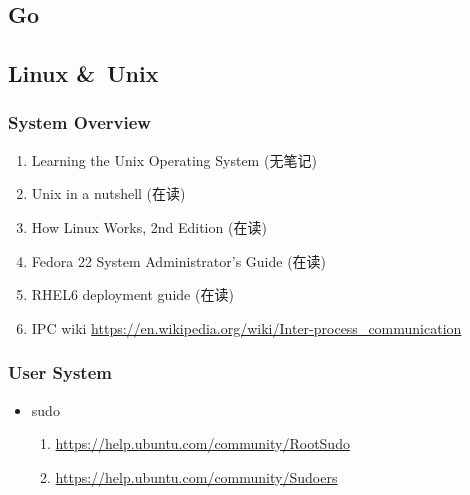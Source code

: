 \documentclass{article}
\begin{document}
\subsection{Go}
%
\subsection{Linux \&\ Unix}
\subsubsection{System Overview}
\begin{enumerate}
    \item Learning the Unix Operating System (无笔记)
    \item Unix in a nutshell (在读)
    \item How Linux Works, 2nd Edition (在读)
    \item Fedora 22 System Administrator's Guide (在读)
    \item RHEL6 deployment guide (在读)
    \item IPC wiki \url{https://en.wikipedia.org/wiki/Inter-process_communication}
\end{enumerate}
%
\subsubsection{User System}
%
\begin{itemize}
    \item sudo
        \begin{enumerate}
            \item \url{https://help.ubuntu.com/community/RootSudo}
            \item \url{https://help.ubuntu.com/community/Sudoers}
        \end{enumerate}
\end{itemize}
%
\end{document}
